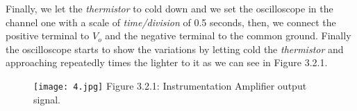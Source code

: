 Finally, we let the {\itshape thermistor} to cold down and we set the oscilloscope in the channel one with a scale of {\itshape time/division} of 0.5 seconds, then, we connect the positive terminal to $V_{o}$ and the negative terminal to the common ground. Finally the oscilloscope starts to show the variations by letting cold the {\itshape thermistor} and approaching repeatedly times the lighter to it as we can see in Figure 3.2.1. \hfill \break

\begin{figure}[H]
\texttt{[image: 4.jpg]}
\linebreak \linebreak \centering Figure 3.2.1: Instrumentation Amplifier output signal.
\end{figure}

\pagebreak